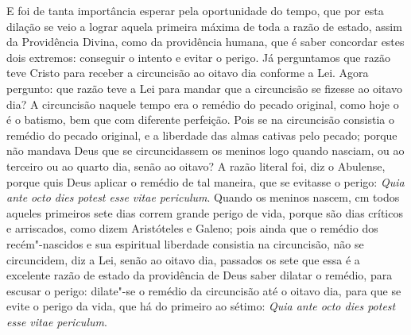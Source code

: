 E foi de tanta importância esperar pela oportunidade do tempo, que por
esta dilação se veio a lograr aquela primeira máxima de toda a razão de
estado, assim da Providência Divina, como da providência humana, que é
saber concordar estes dois extremos: conseguir o intento e evitar o
perigo. Já perguntamos que razão teve Cristo para receber a circuncisão
ao oitavo dia conforme a Lei. Agora pergunto: que razão teve a Lei para
mandar que a circuncisão se fizesse ao oitavo dia? A circuncisão naquele
tempo era o remédio do pecado original, como hoje o é o batismo, bem que
com diferente perfeição. Pois se na circuncisão consistia o remédio do
pecado original, e a liberdade das almas cativas pelo pecado; porque não
mandava Deus que se circuncidassem os meninos logo quando nasciam, ou ao
terceiro ou ao quarto dia, senão ao oitavo? A razão literal foi, diz
o Abulense, porque quis Deus aplicar o remédio de tal maneira, que se
evitasse o perigo: \emph{Quia ante octo dies potest esse vitae
periculum}. Quando os meninos nascem, cm todos aqueles primeiros sete
dias correm grande perigo de vida, porque são dias críticos e
arriscados, como dizem Aristóteles e Galeno; pois ainda que o remédio
dos recém"-nascidos e sua espiritual liberdade consistia na circuncisão,
não se circuncidem, diz a Lei, senão ao oitavo dia, passados os sete que
essa é a excelente razão de estado da providência de Deus saber dilatar
o remédio, para escusar o perigo: dilate"-se o remédio da circuncisão até
o oitavo dia, para que se evite o perigo da vida, que há do primeiro ao
sétimo: \emph{Quia ante octo dies potest esse vitae periculum}.

